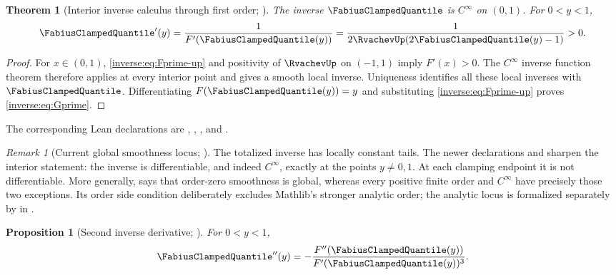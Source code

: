 \documentclass[11pt,oneside]{article}
\newtheorem{theorem}{Theorem}[section]
\newtheorem{proposition}[proposition]{Proposition}
\theoremstyle{definition}
\theoremstyle{remark}
\newtheorem{remark}[remark]{Remark}
\begin{document}
\begin{theorem}[Interior inverse calculus through first order; \Formalized]
\label{inverse:thm:inverse-calculus}
The inverse $\FabiusClampedQuantile$ is $C^\infty$ on $(0,1)$.  For $0<y<1$,
\begin{equation}
 \FabiusClampedQuantile'(y)
   =\frac1{F'(\FabiusClampedQuantile(y))}
     =\frac1{2\RvachevUp(2\FabiusClampedQuantile(y)-1)}>0.
 \label{inverse:eq:Gprime}
\end{equation}
\end{theorem}

\begin{proof}
For $x\in(0,1)$, \eqref{inverse:eq:Fprime-up} and positivity of $\RvachevUp$ on
$(-1,1)$ imply $F'(x)>0$.  The $C^\infty$ inverse function theorem
therefore applies at every interior point and gives a smooth local inverse.
Uniqueness identifies all these local inverses with $\FabiusClampedQuantile$.  Differentiating
$F(\FabiusClampedQuantile(y))=y$ and substituting \eqref{inverse:eq:Fprime-up} proves
\eqref{inverse:eq:Gprime}.
\end{proof}

The corresponding Lean declarations are ,
,
, and
.

\begin{remark}[Current global smoothness locus; \Formalized]
The totalized inverse has locally constant tails.  The newer declarations
 and
 sharpen the interior statement: the
inverse is differentiable, and indeed \(C^\infty\), exactly at the points
\(y\ne0,1\).  At each clamping endpoint it is not differentiable.  More
generally,  says that order-zero smoothness is
global, whereas every positive finite order and \(C^\infty\) have precisely
those two exceptions.  Its order side condition deliberately excludes
Mathlib's stronger analytic order; the analytic locus is formalized separately by
 in .
\end{remark}

\begin{proposition}[Second inverse derivative; \Formalized]
\label{inverse:prop:inverse-second-derivative}
For $0<y<1$,
\begin{equation}
 \FabiusClampedQuantile''(y)
   =-\frac{F''(\FabiusClampedQuantile(y))}
           {F'(\FabiusClampedQuantile(y))^3}.
 \label{inverse:eq:Gsecond}
\end{equation}
\end{proposition}
\end{document}
